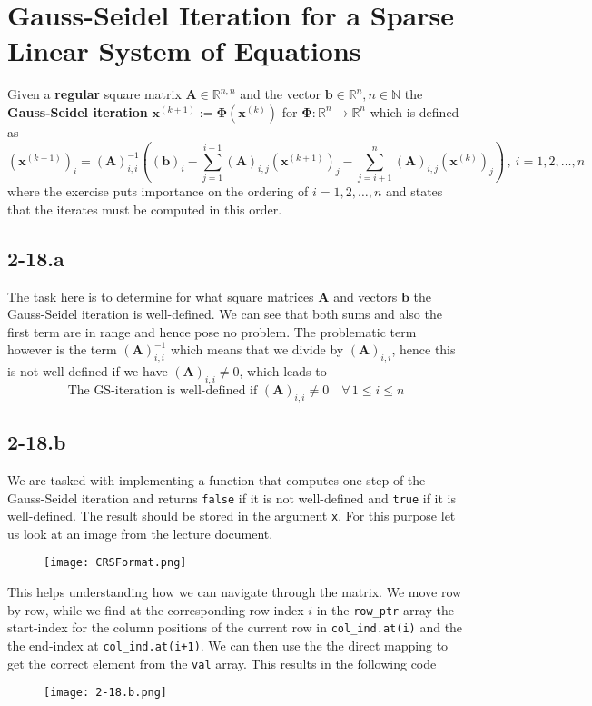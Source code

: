 \documentclass{article}
\newcommand\xkn{\mathbf{x}^{\left(k+1\right)}}
\newcommand\xk{\mathbf{x}^{\left(k\right)}}
\newcommand\A{\mathbf{A}}
\begin{document}
\section*{Gauss-Seidel Iteration for a Sparse Linear System of Equations}
Given a \textbf{regular} square matrix $\mathbf{A}\in\mathbb{R}^{n,n}$ and the vector $\mathbf{b} \in \mathbb{R}^{n}, n \in \mathbb{N}$ the \textbf{Gauss-Seidel iteration} $\xkn := \mathbf{\Phi}\left(\xk\right)$ for $\mathbf{\Phi} : \mathbb{R}^{n} \to \mathbb{R}^{n}$ which is defined as
\begin{equation*}
    \left(\xkn\right)_{i} = \left(\A\right)_{i,i}^{-1}\left(\left(\mathbf{b}\right)_{i} - \sum_{j=1}^{i-1}\left(\mathbf{A}\right)_{i,j}\left(\xkn\right)_{j} - \sum_{j=i+1}^{n}\left(\A\right)_{i,j}\left(\xk\right)_{j}\right)\,,\: i=1,2,\dots,n 
\end{equation*}
where the exercise puts importance on the ordering of $i = 1, 2, \dots,n$ and states that the iterates must be computed in this order. 
\subsection*{2-18.a}
The task here is to determine for what square matrices $\mathbf{A}$ and vectors $\mathbf{b}$ the Gauss-Seidel iteration is well-defined. We can see that both sums and also the first term are in range and hence pose no problem. The problematic term however is the term $\left(\A\right)_{i,i}^{-1}$ which means that we divide by $\left(\A\right)_{i,i}$, hence this is not well-defined if we have $\left(\A\right)_{i,i}\neq 0$, which leads to
\begin{equation*}
    \text{The GS-iteration is well-defined if } \left(\A\right)_{i,i} \neq 0\quad \forall \, 1 \leq i \leq n
\end{equation*}
\subsection*{2-18.b}
We are tasked with implementing a function that computes one step of the Gauss-Seidel iteration and returns \verb|false| if it is not well-defined and \verb|true| if it is well-defined. The result should be stored in the argument \verb|x|. For this purpose let us look at an image from the lecture document. \begin{figure}[!hbt]
    \centering
\texttt{[image: CRSFormat.png]}
\end{figure}
This helps understanding how we can navigate through the matrix. We move row by row, while we find at the corresponding row index $i$ in the \verb|row_ptr| array the start-index for the column positions of the current row in \verb|col_ind.at(i)| and the the end-index at \verb|col_ind.at(i+1)|. We can then use the the direct mapping to get the correct element from the \verb|val| array. This results in the following code
\begin{figure}[!hbt]
    \centering
\texttt{[image: 2-18.b.png]}
\end{figure}
\end{document}
